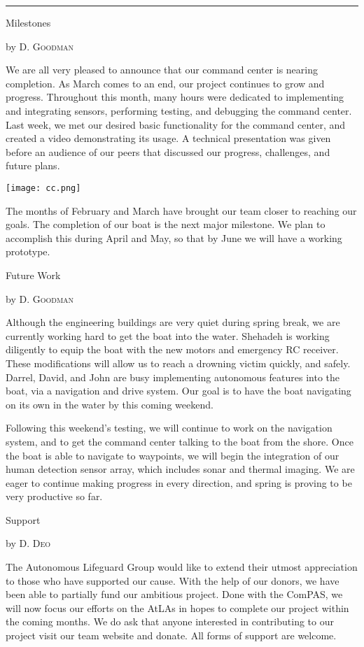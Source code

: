 \documentclass[10pt,a4paper]{article}
\newcommand{\SepRule}{\noindent							 %
						\begin{center}
							\rule{250pt}{1pt}
						\end{center}
						}
\newcommand{\NewsItem}[1]{%
		\usefont{T1}{augie}{m}{n} 	
		\large #1 \vspace{4pt}
		\par \normalsize \normalfont}
\newcommand{\NewsAuthor}[1]{%
			\hfill by \textsc{#1} \vspace{4pt}
			\par \normalfont}
\begin{document}
% 
\vspace{0.5cm}
	\SepRule
\vspace{0.5cm}
\begin{multicols}{3}
	\NewsItem{Milestones}
	\NewsAuthor{D. Goodman}
    
    We are all very pleased to announce that our command center is nearing completion. As March comes to an end, our project continues to grow and progress. Throughout this month, many hours were dedicated to implementing and integrating sensors, performing testing, and debugging the command center. Last week, we met our desired basic functionality for the command center, and created a video demonstrating its usage. A technical presentation was given before an audience of our peers that discussed our progress, challenges, and future plans.
\begin{center}
			\texttt{[image: cc.png]}
		\end{center}
The months of February and March have brought our team closer to reaching our goals. The completion of our boat is the next major milestone. We plan to accomplish this during April and May, so that by June we will have a working prototype. 
		

\vspace{1cm}
\NewsItem{Future Work}
\NewsAuthor{D. Goodman}
	Although the engineering buildings are very quiet during spring break, we are currently working hard to get the boat into the water. Shehadeh is working diligently to equip the boat with the new motors and emergency RC receiver. These modifications will allow us to reach a drowning victim quickly, and safely. Darrel, David, and John are busy implementing autonomous features into the boat, via a navigation and drive system. Our goal is to have the boat navigating on its own in the water by this coming weekend.

Following this weekend's testing, we will continue to work on the navigation system, and to get the command center talking to the boat from the shore. Once the boat is able to navigate to waypoints, we will begin the integration of our human detection sensor array, which includes sonar and thermal imaging. We are eager to continue making progress in every direction, and spring is proving to be very productive so far.

\vspace{1cm}
\NewsItem{Support}
\NewsAuthor{D. Deo}
The Autonomous Lifeguard Group would like to extend their utmost appreciation to those who have supported our cause. With the help of our donors, we have been able to partially fund our ambitious project. Done with the ComPAS, we will now focus our efforts on the AtLAs in hopes to complete our project within the coming months. We do ask that anyone interested in contributing to our project visit our team website and donate. All forms of support are welcome.
\end{multicols}
\end{document}
